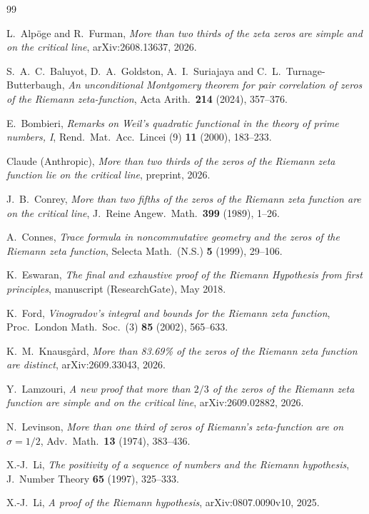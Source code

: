 \documentclass[reqno,11pt]{amsart}
\numberwithin{equation}{section}
\theoremstyle{plain}
\theoremstyle{remark}
\begin{document}
\begin{thebibliography}{99}

 L.~Alp\"oge and R.~Furman, \emph{More than two thirds of the
zeta zeros are simple and on the critical line}, arXiv:2608.13637, 2026.

 S.~A.~C.~Baluyot, D.~A.~Goldston, A.~I.~Suriajaya and
C.~L.~Turnage-Butterbaugh, \emph{An unconditional Montgomery theorem for pair
correlation of zeros of the Riemann zeta-function}, Acta Arith.\ \textbf{214}
(2024), 357--376.

 E.~Bombieri, \emph{Remarks on Weil's quadratic functional in
the theory of prime numbers, I}, Rend.\ Mat.\ Acc.\ Lincei (9) \textbf{11}
(2000), 183--233.

 Claude (Anthropic), \emph{More than two thirds of the zeros of
the Riemann zeta function lie on the critical line}, preprint, 2026.

 J.~B.~Conrey, \emph{More than two fifths of the zeros of the
Riemann zeta function are on the critical line}, J.\ Reine Angew.\ Math.\
\textbf{399} (1989), 1--26.

 A.~Connes, \emph{Trace formula in noncommutative geometry and
the zeros of the Riemann zeta function}, Selecta Math.\ (N.S.) \textbf{5}
(1999), 29--106.

 K.~Eswaran, \emph{The final and exhaustive proof of the
Riemann Hypothesis from first principles}, manuscript (ResearchGate), May 2018.

 K.~Ford, \emph{Vinogradov's integral and bounds for the
Riemann zeta function}, Proc.\ London Math.\ Soc.\ (3) \textbf{85} (2002),
565--633.

 K.~M.~Knausg{\aa}rd, \emph{More than 83.69\% of the zeros of
the Riemann zeta function are distinct}, arXiv:2609.33043, 2026.

 Y.~Lamzouri, \emph{A new proof that more than $2/3$ of the
zeros of the Riemann zeta function are simple and on the critical line},
arXiv:2609.02882, 2026.

 N.~Levinson, \emph{More than one third of zeros of Riemann's
zeta-function are on $\sigma=1/2$}, Adv.\ Math.\ \textbf{13} (1974), 383--436.

 X.-J.~Li, \emph{The positivity of a sequence of numbers and the
Riemann hypothesis}, J.\ Number Theory \textbf{65} (1997), 325--333.

 X.-J.~Li, \emph{A proof of the Riemann hypothesis},
arXiv:0807.0090v10, 2025.


\end{thebibliography}
\end{document}
